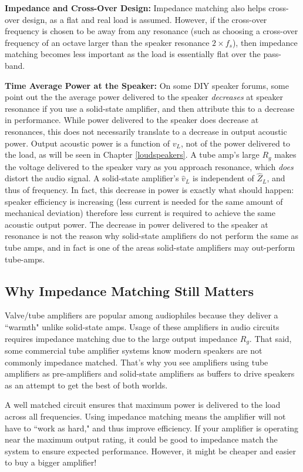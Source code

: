 \documentclass[10pt]{book}
\begin{document}
\textbf{Impedance and Cross-Over Design:} Impedance matching also helps cross-over design, as a flat and real load is assumed. However, if the cross-over frequency is chosen to be away from any resonance (such as choosing a cross-over frequency of an octave larger than the speaker resonance $2\times f_s$), then impedance matching becomes less important as the load is essentially flat over the pass-band.

\textbf{Time Average Power at the Speaker:} On some DIY speaker forums, some point out the the average power delivered to the speaker \textit{decreases} at speaker resonance if you use a solid-state amplifier, and then attribute this to a decrease in performance. While power delivered to the speaker does decrease at resonances, this does not necessarily translate to a decrease in output acoustic power. Output acoustic power is a function of $v_L$, not of the power delivered to the load, as will be seen in Chapter \ref{loudspeakers}. A tube amp's large $R_g$ makes the voltage delivered to the speaker vary as you approach resonance, which \textit{does} distort the audio signal. A solid-state amplifier's $\hat{v}_L$ is independent of $\hat{Z}_L$, and thus of frequency. In fact, this decrease in power is exactly what should happen: speaker efficiency is increasing (less current is needed for the same amount of mechanical deviation) therefore less current is required to achieve the same acoustic output power. The decrease in power delivered to the speaker at resonance is not the reason why solid-state amplifiers do not perform the same as tube amps, and in fact is one of the areas solid-state amplifiers may out-perform tube-amps. 

\subsection{Why Impedance Matching Still Matters}
Valve/tube amplifiers are popular among audiophiles because they deliver a ``warmth" unlike solid-state amps. Usage of these amplifiers in audio circuits requires impedance matching due to the large output impedance $R_g$. That said, some commercial tube amplifier systems know modern speakers are not commonly impedance matched. That's why you see amplifiers using tube amplifiers as pre-amplifiers and solid-state amplifiers as buffers to drive speakers as an attempt to get the best of both worlds.

A well matched circuit ensures that maximum power is delivered to the load across all frequencies. Using impedance matching means the amplifier will not have to ``work as hard," and thus improve efficiency. If your amplifier is operating near the maximum output rating, it could be good to impedance match the system to ensure expected performance. However, it might be cheaper and easier to buy a bigger amplifier!
\end{document}
